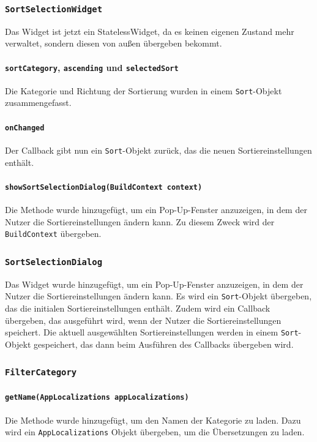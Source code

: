 \documentclass{implementierungsheft}
\begin{document}
\subsubsection*{\texttt{SortSelectionWidget}}
Das Widget ist jetzt ein StatelessWidget, da es keinen eigenen Zustand mehr verwaltet, sondern diesen von außen übergeben bekommt.
\paragraph{\texttt{sortCategory}, \texttt{ascending} und \texttt{selectedSort}} Die Kategorie und Richtung der Sortierung wurden in einem \texttt{Sort}-Objekt zusammengefasst.
\paragraph{\texttt{onChanged}}
Der Callback gibt nun ein \texttt{Sort}-Objekt zurück, das die neuen Sortiereinstellungen enthält.
\paragraph{\texttt{showSortSelectionDialog(BuildContext context)}}
Die Methode wurde hinzugefügt, um ein Pop-Up-Fenster anzuzeigen, in dem der Nutzer die Sortiereinstellungen ändern kann. Zu diesem Zweck wird der \texttt{BuildContext} übergeben.
\subsubsection*{\texttt{SortSelectionDialog}}
Das Widget wurde hinzugefügt, um ein Pop-Up-Fenster anzuzeigen, in dem der Nutzer die Sortiereinstellungen ändern kann. Es wird ein \texttt{Sort}-Objekt übergeben, das die initialen Sortiereinstellungen enthält. Zudem wird ein Callback übergeben, das ausgeführt wird, wenn der Nutzer die Sortiereinstellungen speichert. Die aktuell ausgewählten Sortiereinstellungen werden in einem \texttt{Sort}-Objekt gespeichert, das dann beim Ausführen des Callbacks übergeben wird.
\subsubsection*{\texttt{FilterCategory}}
\paragraph*{\texttt{getName(AppLocalizations appLocalizations)}}
Die Methode wurde hinzugefügt, um den Namen der Kategorie zu laden. Dazu wird ein \texttt{AppLocalizations} Objekt übergeben, um die Übersetzungen zu laden.
\end{document}
